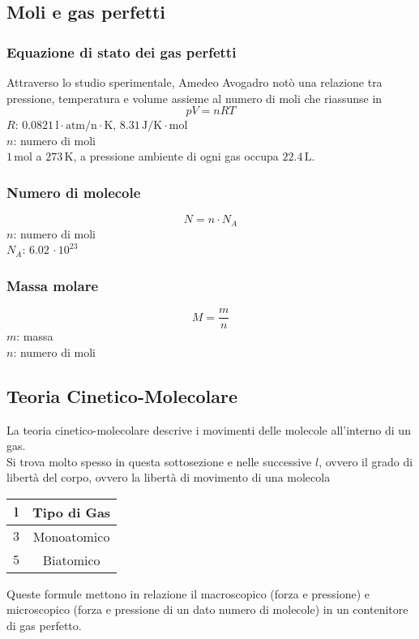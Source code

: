 \subsection{Moli e gas perfetti}

\subsubsection{Equazione di stato dei gas perfetti}
Attraverso lo studio sperimentale, Amedeo Avogadro notò una relazione tra pressione, temperatura
e volume assieme al numero di moli che riassunse in
\begin{equation*}
  pV = nRT
\end{equation*}
\hyperref[tab:R]{$R$}: $0.0821\,\text{l}\cdot\text{atm/n}\cdot\text{K}$,
$8.31\,\text{J/K}\cdot\text{mol}$\\
$n$: numero di moli\\ [\baselineskip]
$1\,\text{mol}$ a $273\,\text{K}$, a pressione ambiente di ogni gas occupa $22.4\,\text{L}$.

\subsubsection{Numero di molecole}
\begin{equation*}
  N = n \cdot N_A
\end{equation*}
$n$: numero di moli\\
\hyperref[tab:Na]{$N_A$}: $6.02\,\cdot10^{23}$

\subsubsection{Massa molare}
\begin{equation*}
  M = \frac{m}{n}
\end{equation*}
$m$: massa\\
$n$: numero di moli

\subsection{Teoria Cinetico-Molecolare}
La teoria cinetico-molecolare descrive i movimenti delle molecole all'interno di un gas.\\
Si trova molto spesso in questa sottosezione e nelle successive $l$, ovvero il grado di libertà 
del corpo, ovvero la libertà di movimento di una molecola\\
\begin{center}
  \begin{tabular}{c c}
    $\boldsymbol{l}$ & \textbf{Tipo di Gas}\\ \hline
    $3$ & Monoatomico \\ \hline
    $5$ & Biatomico\\
  \end{tabular}
\end{center}
Queste formule mettono in relazione il macroscopico (forza e pressione) e microscopico (forza e 
pressione di un dato numero di molecole) in un contenitore di gas perfetto.

